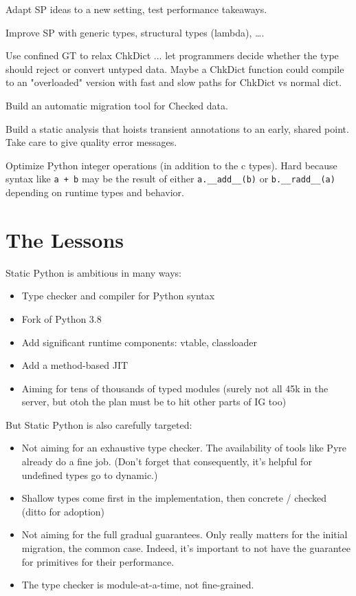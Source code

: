 \documentclass[english,cleveref,submission]{programming}
\newcommand{\SP}{Static Python}
\newcommand{\code}[1]{\texttt{#1}}
\begin{document}
Adapt SP ideas to a new setting, test performance takeaways.

Improve SP with generic types, structural types (lambda), \ldots.

Use confined GT to relax ChkDict ... let programmers decide whether
the type should reject or convert untyped data.
Maybe a ChkDict function could compile to an "overloaded" version with
fast and slow paths for ChkDict vs normal dict.

Build an automatic migration tool for Checked data.

Build a static analysis that hoists transient annotations to an early, shared point.
Take care to give quality error messages.

Optimize Python integer operations (in addition to the c types).
Hard because syntax like \code{a + b} may be the result of either \code{a.\_\_add\_\_(b)}
or \code{b.\_\_radd\_\_(a)} depending on runtime types and behavior.


\section{The Lessons}
\label{s:conclusion}

\SP{} is ambitious in many ways:
\begin{itemize}
  \item Type checker and compiler for Python syntax
  \item Fork of Python 3.8
  \item Add significant runtime components: vtable, classloader
  \item Add a method-based JIT
  \item Aiming for tens of thousands of typed modules (surely not all 45k in the server, but otoh the plan must be to hit other parts of IG too)
\end{itemize}

But \SP{} is also carefully targeted:
\begin{itemize}
  \item
    Not aiming for an exhaustive type checker.
    The availability of tools like Pyre already do a fine job.
    (Don't forget that consequently, it's helpful for undefined types go to dynamic.)
  \item
    Shallow types come first in the implementation, then concrete / checked
    (ditto for adoption)
  \item
    Not aiming for the full gradual guarantees.
    Only really matters for the initial migration, the common case.
    Indeed, it's important to not have the guarantee for primitives for their performance.
  \item
    The type checker is module-at-a-time, not fine-grained.
\end{itemize}
\end{document}
